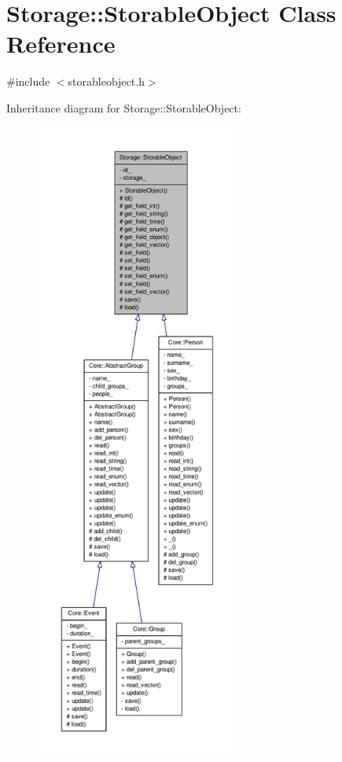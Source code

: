 \hypertarget{classStorage_1_1StorableObject}{
\section{Storage::StorableObject Class Reference}
\label{d4/deb/classStorage_1_1StorableObject}
}


{\ttfamily \#include $<$storableobject.h$>$}



Inheritance diagram for Storage::StorableObject:
\nopagebreak
\begin{figure}[H]
\begin{center}
\leavevmode
\includegraphics[height=600pt]{d1/d35/classStorage_1_1StorableObject__inherit__graph}
\end{center}
\end{figure}


